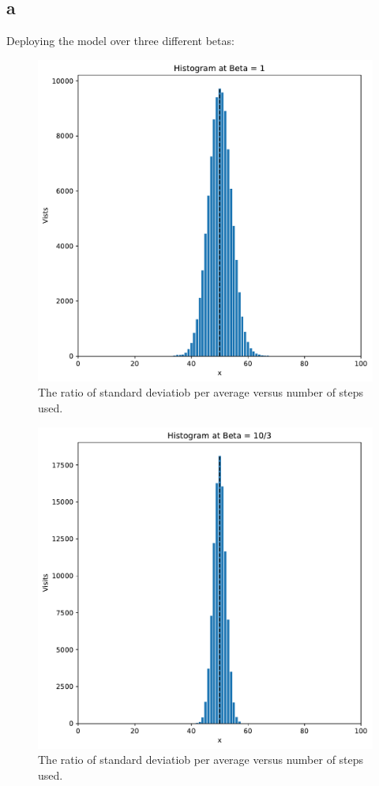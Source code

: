 \documentclass[a4paper]{article}
\theoremstyle{definition}
\begin{document}
\subsection{a}
Deploying the model over three different betas:
\begin{figure}[H]
\centering
\includegraphics[width = 10 cm]{Comp_set_1/Histogram_b1_cs1_2a.pdf}
\caption{The ratio of standard deviatiob per average versus number of steps used.
}
\label{fig:confined_lattice}
\end{figure}  
\begin{figure}[H]
\centering
\includegraphics[width = 10 cm]{Comp_set_1/Histogram_b2_cs1_2a.pdf}
\caption{The ratio of standard deviatiob per average versus number of steps used.
}
\label{fig:confined_lattice}
\end{figure}  
\end{document}
